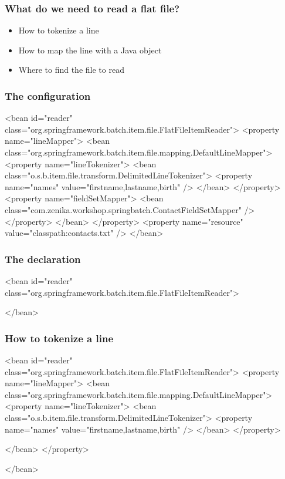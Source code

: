 \begin{frame}
 \frametitle{What do we need to read a flat file?}
 \begin{itemize}
  \item How to tokenize a line
  \item How to map the line with a Java object
  \item Where to find the file to read
 \end{itemize}
\end{frame}


\begin{frame}[fragile]
 \frametitle{The  configuration}

\begin{xmlcode}
<bean id="reader"
      class="org.springframework.batch.item.file.FlatFileItemReader">
  <property name="lineMapper">
    <bean class="org.springframework.batch.item.file.mapping.DefaultLineMapper">
      <property name="lineTokenizer">
        <bean class="o.s.b.item.file.transform.DelimitedLineTokenizer">
          <property name="names" value="firstname,lastname,birth" />
        </bean>
      </property>
      <property name="fieldSetMapper">
        <bean class="com.zenika.workshop.springbatch.ContactFieldSetMapper" />
      </property>
    </bean>
  </property>
  <property name="resource" value="classpath:contacts.txt" />
</bean>
\end{xmlcode}

\end{frame}

\begin{frame}[fragile]
 \frametitle{The  declaration}

\begin{xmlcode}
<bean id="reader"
      class="org.springframework.batch.item.file.FlatFileItemReader">













</bean>
\end{xmlcode}

\end{frame}

\begin{frame}[fragile]
 \frametitle{How to tokenize a line}

\begin{xmlcode}
<bean id="reader"
      class="org.springframework.batch.item.file.FlatFileItemReader">
  <property name="lineMapper">
    <bean class="org.springframework.batch.item.file.mapping.DefaultLineMapper">
      <property name="lineTokenizer">
        <bean class="o.s.b.item.file.transform.DelimitedLineTokenizer">
          <property name="names" value="firstname,lastname,birth" />
        </bean>
      </property>



    </bean>
  </property>

</bean>
\end{xmlcode}
\end{frame}

